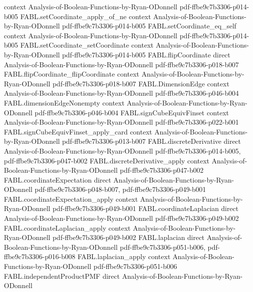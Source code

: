 \begin{theorem}
  {context}
  {Analysis-of-Boolean-Functions-by-Ryan-ODonnell}
  {pdf-ffbe9c7b3306-p014-b005}
\proofstep
  {FABL.setCoordinate_apply_of_ne}
  {context}
  {Analysis-of-Boolean-Functions-by-Ryan-ODonnell}
  {pdf-ffbe9c7b3306-p014-b005}
\proofstep
  {FABL.setCoordinate_eq_self}
  {context}
  {Analysis-of-Boolean-Functions-by-Ryan-ODonnell}
  {pdf-ffbe9c7b3306-p014-b005}
\proofstep
  {FABL.setCoordinate_setCoordinate}
  {context}
  {Analysis-of-Boolean-Functions-by-Ryan-ODonnell}
  {pdf-ffbe9c7b3306-p014-b005}
\proofstep
  {FABL.flipCoordinate}
  {direct}
  {Analysis-of-Boolean-Functions-by-Ryan-ODonnell}
  {pdf-ffbe9c7b3306-p018-b007}
\proofstep
  {FABL.flipCoordinate_flipCoordinate}
  {context}
  {Analysis-of-Boolean-Functions-by-Ryan-ODonnell}
  {pdf-ffbe9c7b3306-p018-b007}
\proofstep
  {FABL.DimensionEdge}
  {context}
  {Analysis-of-Boolean-Functions-by-Ryan-ODonnell}
  {pdf-ffbe9c7b3306-p046-b004}
\proofstep
  {FABL.dimensionEdgeNonempty}
  {context}
  {Analysis-of-Boolean-Functions-by-Ryan-ODonnell}
  {pdf-ffbe9c7b3306-p046-b004}
\proofstep
  {FABL.signCubeEquivFinset}
  {context}
  {Analysis-of-Boolean-Functions-by-Ryan-ODonnell}
  {pdf-ffbe9c7b3306-p022-b001}
\proofstep
  {FABL.signCubeEquivFinset_apply_card}
  {context}
  {Analysis-of-Boolean-Functions-by-Ryan-ODonnell}
  {pdf-ffbe9c7b3306-p013-b007}
\proofstep
  {FABL.discreteDerivative}
  {direct}
  {Analysis-of-Boolean-Functions-by-Ryan-ODonnell}
  {pdf-ffbe9c7b3306-p014-b005,
    pdf-ffbe9c7b3306-p047-b002}
\proofstep
  {FABL.discreteDerivative_apply}
  {context}
  {Analysis-of-Boolean-Functions-by-Ryan-ODonnell}
  {pdf-ffbe9c7b3306-p047-b002}
\proofstep
  {FABL.coordinateExpectation}
  {direct}
  {Analysis-of-Boolean-Functions-by-Ryan-ODonnell}
  {pdf-ffbe9c7b3306-p048-b007,
    pdf-ffbe9c7b3306-p049-b001}
\proofstep
  {FABL.coordinateExpectation_apply}
  {context}
  {Analysis-of-Boolean-Functions-by-Ryan-ODonnell}
  {pdf-ffbe9c7b3306-p049-b001}
\proofstep
  {FABL.coordinateLaplacian}
  {direct}
  {Analysis-of-Boolean-Functions-by-Ryan-ODonnell}
  {pdf-ffbe9c7b3306-p049-b002}
\proofstep
  {FABL.coordinateLaplacian_apply}
  {context}
  {Analysis-of-Boolean-Functions-by-Ryan-ODonnell}
  {pdf-ffbe9c7b3306-p049-b002}
\proofstep
  {FABL.laplacian}
  {direct}
  {Analysis-of-Boolean-Functions-by-Ryan-ODonnell}
  {pdf-ffbe9c7b3306-p051-b006,
    pdf-ffbe9c7b3306-p016-b008}
\proofstep
  {FABL.laplacian_apply}
  {context}
  {Analysis-of-Boolean-Functions-by-Ryan-ODonnell}
  {pdf-ffbe9c7b3306-p051-b006}
\proofstep
  {FABL.independentProductPMF}
  {direct}
  {Analysis-of-Boolean-Functions-by-Ryan-ODonnell}

\end{theorem}
